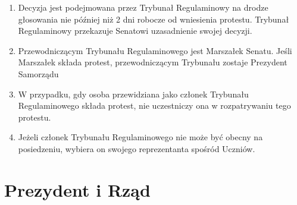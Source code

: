 \documentclass[14pt]{article}
\newenvironment{ustepy}{%
	\begin{enumerate}[leftmargin=1.5em, itemindent=1pt, labelwidth=1em, itemsep=5pt]
	}{%
	\end{enumerate}
}
\begin{document}
\begin{ustepy}
	\item Decyzja jest podejmowana przez Trybunał Regulaminowy na drodze głosowania nie później niż 2 dni robocze od wniesienia protestu. Trybunał Regulaminowy przekazuje Senatowi uzasadnienie swojej decyzji.
	\item Przewodniczącym Trybunału Regulaminowego jest Marszałek Senatu. Jeśli Marszałek składa protest, przewodniczącym Trybunału zostaje Prezydent Samorządu
	\item W przypadku, gdy osoba przewidziana jako członek Trybunału Regulaminowego składa protest, nie uczestniczy ona w rozpatrywaniu tego protestu.
	\item Jeżeli członek Trybunału Regulaminowego nie może być obecny na posiedzeniu, wybiera on swojego reprezentanta spośród Uczniów.
\end{ustepy}
\newpage
\section{Prezydent i Rząd}
\end{document}
